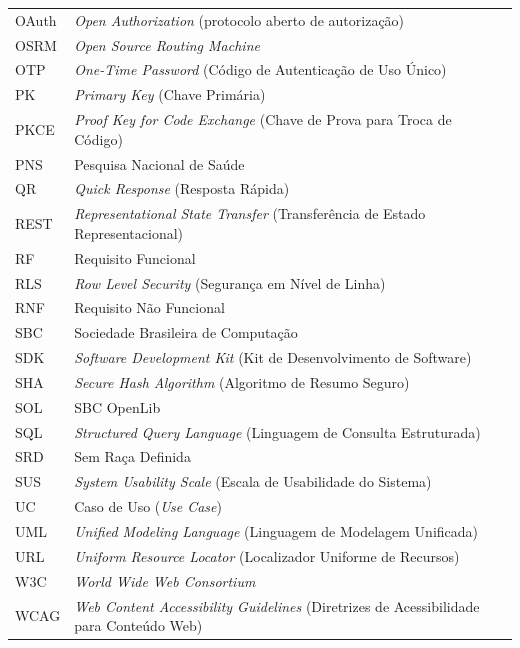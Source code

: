 \begin{singlespacing}
\begin{longtable}{p{3.5cm} p{11.5cm}}
OAuth & \textit{Open Authorization} (protocolo aberto de autorização) \\
OSRM & \textit{Open Source Routing Machine} \\
OTP & \textit{One-Time Password} (Código de Autenticação de Uso Único) \\
PK & \textit{Primary Key} (Chave Primária) \\
PKCE & \textit{Proof Key for Code Exchange} (Chave de Prova para Troca de Código) \\
PNS & Pesquisa Nacional de Saúde \\
QR & \textit{Quick Response} (Resposta Rápida) \\
REST & \textit{Representational State Transfer} (Transferência de Estado Representacional) \\
RF & Requisito Funcional \\
RLS & \textit{Row Level Security} (Segurança em Nível de Linha) \\
RNF & Requisito Não Funcional \\
SBC & Sociedade Brasileira de Computação \\
SDK & \textit{Software Development Kit} (Kit de Desenvolvimento de Software) \\
SHA & \textit{Secure Hash Algorithm} (Algoritmo de Resumo Seguro) \\
SOL & SBC OpenLib \\
SQL & \textit{Structured Query Language} (Linguagem de Consulta Estruturada) \\
SRD & Sem Raça Definida \\
SUS & \textit{System Usability Scale} (Escala de Usabilidade do Sistema) \\
UC & Caso de Uso (\textit{Use Case}) \\
UML & \textit{Unified Modeling Language} (Linguagem de Modelagem Unificada) \\
URL & \textit{Uniform Resource Locator} (Localizador Uniforme de Recursos) \\
W3C & \textit{World Wide Web Consortium} \\
WCAG & \textit{Web Content Accessibility Guidelines} (Diretrizes de Acessibilidade para Conteúdo Web) \\
\end{longtable}
\end{singlespacing}

\clearpage

